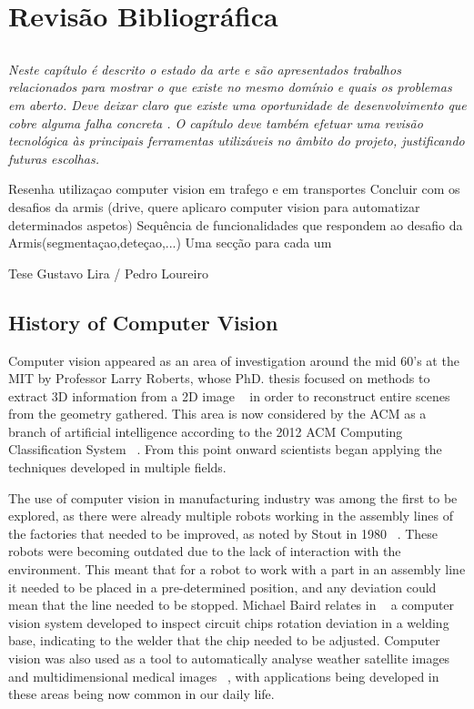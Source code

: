 
\chapter{Revisão Bibliográfica} \label{chap:sota}

\section*{}
\textit{
Neste capítulo é descrito o estado da arte e são
apresentados trabalhos relacionados para mostrar o que existe no
mesmo domínio e quais os problemas em aberto.
Deve deixar claro que existe uma oportunidade de desenvolvimento que
cobre alguma falha concreta .
O capítulo deve também efetuar uma revisão tecnológica às principais
ferramentas utilizáveis no âmbito do projeto, justificando futuras
escolhas.
}

Resenha utilizaçao computer vision em trafego e em transportes
Concluir com os desafios da armis (drive, quere aplicaro computer vision para automatizar determinados aspetos)
Sequência de funcionalidades que respondem ao desafio da Armis(segmentaçao,deteçao,...)
Uma secção para cada um

Tese Gustavo Lira / Pedro Loureiro

\section{History of Computer Vision}

Computer vision appeared as an area of investigation around the mid 60's at the MIT by Professor Larry Roberts, whose PhD. thesis focused on methods to extract 3D information from a 2D image ~\cite{huang_computer_1996} in order to reconstruct entire scenes from the geometry gathered. This area is now considered by the ACM as a branch of artificial intelligence according to the 2012 ACM Computing Classification System ~\cite{acm_2012_2012}. From this point onward scientists began applying the techniques developed in multiple fields.

The use of computer vision in manufacturing industry was among the first to be explored, as there were already multiple robots working in the assembly lines of the factories that needed to be improved, as noted by Stout in 1980 ~\cite{stout_computer_1980}. These robots were becoming outdated due to the lack of interaction with the environment. This meant that for a robot to work with a part in an assembly line it needed to be placed in a pre-determined position, and any deviation could mean that the line needed to be stopped. Michael Baird relates in ~\cite{l._baird_sight-i:_1978} a computer vision system developed to inspect circuit chips rotation deviation in a welding base, indicating to the welder that the chip needed to be adjusted. Computer vision was also used as a tool to automatically analyse weather satellite images ~\cite{binford_computer_1973-2} and multidimensional medical images ~\cite{ayache_medical_1998}, with applications being developed in these areas being now common in our daily life.


